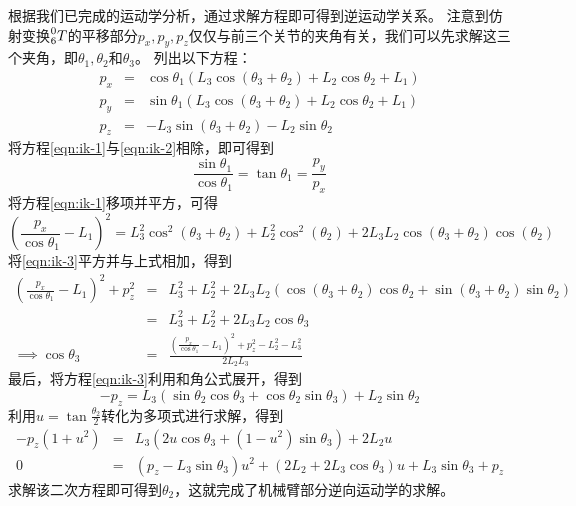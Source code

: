 \documentclass{ctexart}
\begin{document}
根据我们已完成的运动学分析，通过求解方程即可得到逆运动学关系。
注意到仿射变换$\prescript{0}{6}{T}$的平移部分$p_x, p_y, p_z$仅仅与前三个关节的夹角有关，我们可以先求解这三个夹角，即$\theta_1, \theta_2$和$\theta_3$。
列出以下方程：
\begin{eqnarray}
    \label{eqn:ik-1}
    p_x & = & \cos{\theta_1} \left( {L_3} \cos{\left( {{\theta }_3}+{{\theta }_2}\right) }+{L_2} \cos{\theta_2}+{L_1}\right) \\
    \label{eqn:ik-2}
    p_y & = & \sin{\theta_1} \left( {L_3} \cos{\left( {{\theta }_3}+{{\theta }_2}\right) }+{L_2} \cos{\theta_2}+{L_1}\right)  \\
    \label{eqn:ik-3}
    p_z & = & -{L_3} \sin{\left( {{\theta }_3}+{{\theta }_2}\right) } -{L_2} \sin{\theta_2}
\end{eqnarray}
将方程\eqref{eqn:ik-1}与\eqref{eqn:ik-2}相除，即可得到
\begin{equation}
    \label{eqn:ik-theta-one}
    \frac{\sin \theta_1}{\cos \theta_1} = \tan \theta_1 = \frac{p_y}{p_x}
\end{equation}
将方程\eqref{eqn:ik-1}移项并平方，可得
\begin{equation*}
    \left( \frac{p_x}{\cos \theta_1} - L_1 \right)^2 =
    L_3^2 \cos^2(\theta_3 + \theta_2) + L_2^2 \cos^2 (\theta_2) + 2 L_3 L_2 \cos (\theta_3 + \theta_2) \cos (\theta_2)
\end{equation*}
将\eqref{eqn:ik-3}平方并与上式相加，得到
\begin{eqnarray}
    \label{eqn:ik-theta-three}
    \left( \frac{p_x}{\cos \theta_1} - L_1 \right)^2 + p_z^2 
    & = & L_3^2 + L_2^2 + 2 L_3 L_2 \left( \cos(\theta_3 + \theta_2) \cos \theta_2 + \sin(\theta_3 + \theta_2) \sin \theta_2 \right) \nonumber \\
    & = & L_3^2 + L_2^2 + 2 L_3 L_2 \cos \theta_3 \nonumber \\
    \implies \cos \theta_3 & = & \frac{\left( \frac{p_x}{\cos \theta_1} - L_1 \right)^2 + p_z^2 - L_2^2 - L_3^2}{2 L_2 L_3}
\end{eqnarray}
最后，将方程\eqref{eqn:ik-3}利用和角公式展开，得到
\begin{equation*}
    - p_z = L_3 (\sin \theta_2 \cos \theta_3 + \cos \theta_2 \sin \theta_3) + L_2 \sin \theta_2
\end{equation*}
利用$u = \tan \frac{\theta_2}{2}$转化为多项式进行求解，得到
\begin{eqnarray*}
    - p_z (1 + u^2) &=& L_3 (2u \cos \theta_3 + (1 - u^2) \sin \theta_3) + 2 L_2 u \\
    0 &=& (p_z - L_3 \sin \theta_3) u^2 + (2 L_2 + 2 L_3 \cos \theta_3) u + L_3 \sin \theta_3 + p_z
\end{eqnarray*}
求解该二次方程即可得到$\theta_2$，这就完成了机械臂部分逆向运动学的求解。
\end{document}
